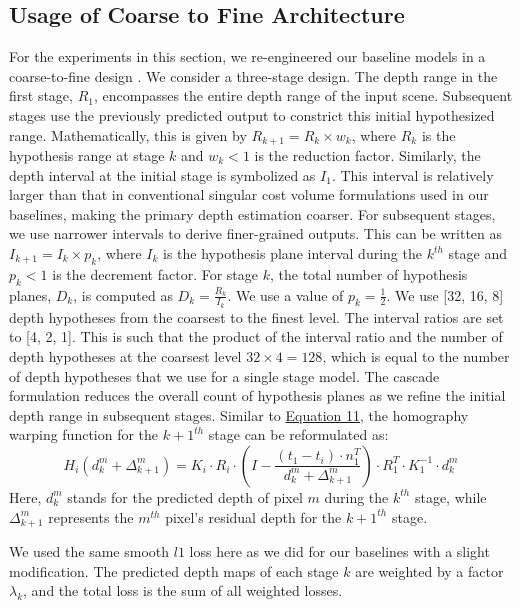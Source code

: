 \subsection{Usage of Coarse to Fine Architecture} \label{subsec:c2f}
For the experiments in this section, we re-engineered our baseline models in a coarse-to-fine design \cite{Gu2020}. We consider a three-stage design. The depth range in the first stage, \(R_1\), encompasses the entire depth range of the input scene. Subsequent stages use the previously predicted output to constrict this initial hypothesized range. Mathematically, this is given by \(R_{k+1} = R_k \times w_k\), where \(R_k\) is the hypothesis range at stage \(k\) and \(w_k < 1\) is the reduction factor. Similarly, the depth interval at the initial stage is symbolized as \(I_1\). This interval is relatively larger than that in conventional singular cost volume formulations used in our baselines, making the primary depth estimation coarser. For subsequent stages, we use narrower intervals to derive finer-grained outputs. This can be written as \(I_{k+1} = I_k \times p_k\), where \(I_k\) is the hypothesis plane interval during the \(k^{th}\) stage and \(p_k < 1\) is the decrement factor. For stage \(k\), the total number of hypothesis planes, \(D_k\), is computed as \(D_k = \frac{R_k}{I_k}\). We use a value of \(p_k =\frac{1}{2}\). We use [32, 16, 8] depth hypotheses from the coarsest to the finest level. The interval ratios are set to [4, 2, 1]. This is such that the product of the interval ratio and the number of depth hypotheses at the coarsest level $32\times4=128$, which is equal to the number of depth hypotheses that we use for a single stage {\mvsn} model\cite{Gu2020}. The cascade formulation reduces the overall count of hypothesis planes as we refine the initial depth range in subsequent stages. Similar to \hyperref[eq:homography]{Equation 11}, the homography warping function for the \(k + 1^{th}\) stage can be reformulated as:
\begin{equation}
H_i(d^m_k + \Delta^m_{k+1}) = K_i \cdot R_i \cdot (I - \frac{(t_1 - t_i) \cdot n^T_1}{d^m_k + \Delta^m_{k+1}}) \cdot R^T_1 \cdot K^{-1}_1 \cdot d^m_k
\end{equation}
Here, \(d^m_k\) stands for the predicted depth of pixel \(m\) during the \(k^{th}\) stage, while \(\Delta^m_{k+1}\) represents the \(m^{th}\) pixel's residual depth for the \(k + 1^{th}\) stage\cite{zhu2021deep}.

We used the same smooth \(l1\) loss here as we did for our baselines with a slight modification. The predicted depth maps of each stage \(k\) are weighted by a factor \(\lambda_k\), and the total loss is the sum of all weighted losses. \par

